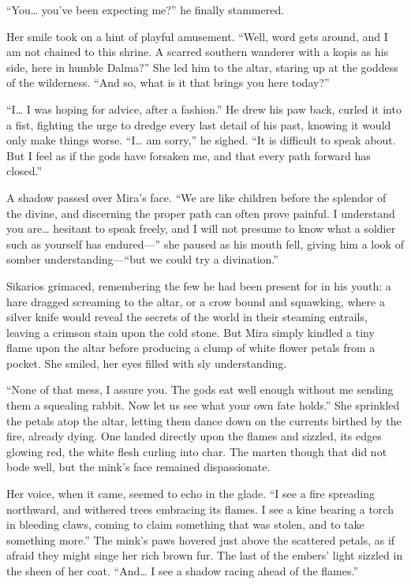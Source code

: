 ``You\ldots{} you've been expecting me?'' he finally stammered.

Her smile took on a hint of playful amusement. ``Well, word gets around, and I am not chained to this shrine. A scarred southern wanderer with a kopis as his side, here in humble Dalma?'' She led him to the altar, staring up at the goddess of the wilderness. ``And so, what is it that brings you here today?''

``I\ldots{} I was hoping for advice, after a fashion.'' He drew his paw back, curled it into a fist, fighting the urge to dredge every last detail of his past, knowing it would only make things worse. ``I\ldots{} am sorry,'' he sighed. ``It is difficult to speak about. But I feel as if the gods have forsaken me, and that every path forward has closed.''

A shadow passed over Mira's face. ``We are like children before the splendor of the divine, and discerning the proper path can often prove painful. I understand you are\ldots{} hesitant to speak freely, and I will not presume to know what a soldier such as yourself has endured---'' she paused as his mouth fell, giving him a look of somber understanding---``but we could try a divination.''

Sikarios grimaced, remembering the few he had been present for in his youth: a hare dragged screaming to the altar, or a crow bound and squawking, where a silver knife would reveal the secrets of the world in their steaming entrails, leaving a crimson stain upon the cold stone. But Mira simply kindled a tiny flame upon the altar before producing a clump of white flower petals from a pocket. She smiled, her eyes filled with sly understanding.

``None of that mess, I assure you. The gods eat well enough without me sending them a squealing rabbit. Now let us see what your own fate holds.'' She sprinkled the petals atop the altar, letting them dance down on the currents birthed by the fire, already dying. One landed directly upon the flames and sizzled, its edges glowing red, the white flesh curling into char. The marten though that did not bode well, but the mink's face remained dispassionate.

Her voice, when it came, seemed to echo in the glade. ``I see a fire spreading northward, and withered trees embracing its flames. I see a kine bearing a torch in bleeding claws, coming to claim something that was stolen, and to take something more.'' The mink's paws hovered just above the scattered petals, as if afraid they might singe her rich brown fur. The last of the embers' light sizzled in the sheen of her coat. ``And\ldots{} I see a shadow racing ahead of the flames.''

